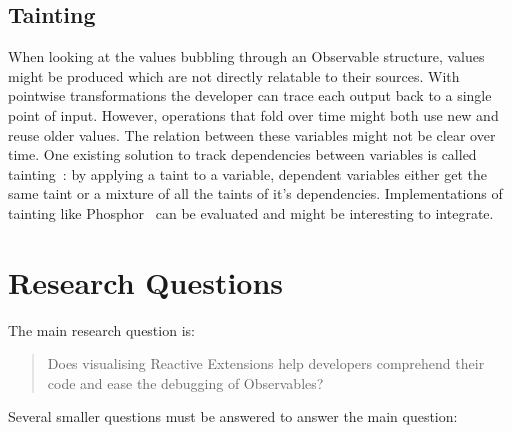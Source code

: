 \documentclass[11pt,a4paper]{article}
\begin{document}
\subsection{Tainting}
When looking at the values bubbling through an Observable structure, values might be produced which are not directly relatable to their sources. With pointwise transformations the developer can trace each output back to a single point of input. However, operations that fold over time might both use new and reuse older values. The relation between these variables might not be clear over time. One existing solution to track dependencies between variables is called tainting~\cite{bell2015dynamic}: by applying a taint to a variable, dependent variables either get the same taint or a mixture of all the taints of it's dependencies. Implementations of tainting like Phosphor~\cite{bell2014phosphor} can be evaluated and might be interesting to integrate.

\section{Research Questions}
The main research question is:

\begin{quotation}
	\noindent
	Does visualising Reactive Extensions help developers comprehend their code and ease the debugging of Observables?
\end{quotation}

\noindent 
Several smaller questions must be answered to answer the main question:
\end{document}
